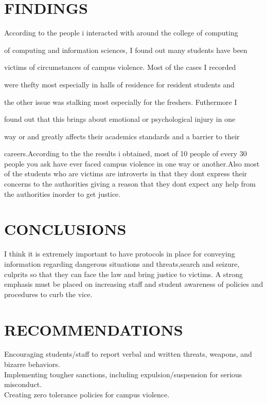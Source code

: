 \documentclass[10pt]{article}
\begin{document}
\section{FINDINGS}
{   According to the people i interacted with around the college of computing 

	of computing and information sciences, I found out many students have been 

	victims of circumstances of campus violence. Most of the cases I recorded 

	were thefty most especially in halls of residence for resident students and 

	the other issue was stalking most especially for the freshers. Futhermore I 

	found out that this brings about emotional or psychological injury in one 

	way or and greatly affects their academics standards and a barrier to their 

	careers.According to the the results i obtained, most of 10 people of every 30 people you ask have ever faced campus violence in one 
	way or another.Also most of the students who are victims are introverts in that they dont express their concerns to the authorities
	giving a reason that they dont expect any help from the authorities inorder to get justice.
	
	

}


	
\section{CONCLUSIONS}
{I think it is extremely important to have protocols in place for conveying information regarding dangerous situations and threats,search and seizure, culprits so that they can face the law and bring justice to victims. A strong emphasis must be placed on increasing staff and student awareness of policies and procedures to curb the vice.
}
\section{RECOMMENDATIONS}
{Encouraging students/staff to report verbal and written threats, weapons, and bizarre behaviors.\\
	Implementing tougher sanctions, including expulsion/suspension for serious misconduct.\\
	Creating zero tolerance policies for campus violence.
}
\end{document}
